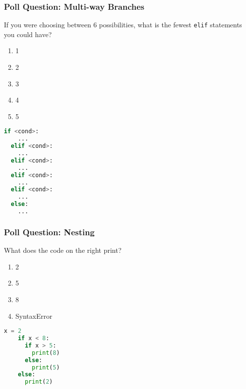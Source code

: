 \documentclass{beamer}
\begin{document}
%
%
\begin{frame}[fragile]
  \frametitle{Poll Question: Multi-way Branches}
  If you were choosing between 6 possibilities, what is the fewest \lstinline|elif| statements you could have?
  \vfill
  \begin{minipage}{0.49\textwidth}
    \begin{enumerate}[A]
      \item 1
      \item 2
      \item 3
      \item 4
      \item 5
    \end{enumerate}
  \end{minipage}
  \pause
  \begin{minipage}{0.49\textwidth}
    \begin{lstlisting}[language=Python, autogobble]
  if <cond>:
    ...
  elif <cond>:
    ...
  elif <cond>:
    ...
  elif <cond>:
    ...
  elif <cond>:
    ...
  else:
    ...
    \end{lstlisting}
  \end{minipage}
\end{frame}

%
%
\begin{frame}[fragile]
  \frametitle{Poll Question: Nesting}
  What does the code on the right print?
  \vfill
  \begin{minipage}{0.49\textwidth}
    \begin{enumerate}[A]
      \item 2
      \item 5
      \item 8
      \item SyntaxError
    \end{enumerate}
  \end{minipage}
  \begin{minipage}{0.49\textwidth}
    \begin{lstlisting}[language=Python, autogobble]
    x = 2
    if x < 8:
      if x > 5:
        print(8)
      else:
        print(5)
    else:
      print(2)
    \end{lstlisting}
  \end{minipage}
\end{frame}

%
%
\end{document}
